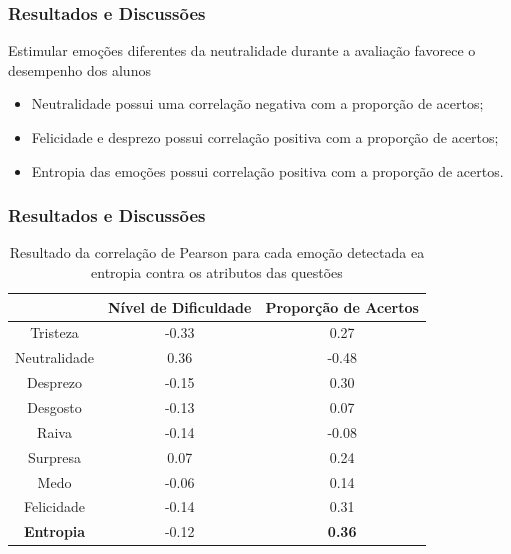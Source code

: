 \documentclass{beamer}
\begin{document}
\begin{frame}
\frametitle{Resultados e Discuss\~oes}
\begin{block}{Estimular emo\c{c}\~oes diferentes da neutralidade durante a avalia\c{c}\~ao favorece o desempenho dos alunos}
\begin{itemize}
\item Neutralidade possui uma correla\c{c}\~ao negativa com a propor\c{c}\~ao de acertos;
\item Felicidade e desprezo possui correla\c{c}\~ao positiva com a propor\c{c}\~ao de acertos;
\pause
\item Entropia das emo\c{c}\~oes possui correla\c{c}\~ao positiva com a propor\c{c}\~ao de acertos.
\end{itemize}
\end{block}

\end{frame}

\begin{frame}
\frametitle{Resultados e Discuss\~oes}
\begin{table}[]\footnotesize
\centering
\caption{Resultado​ ​da​ ​correla\c{c}\~ao​ ​de​ ​Pearson​ ​para​ ​cada​ ​emo\c{c}\~ao​ ​detectada
e​ ​a​ ​entropia​ ​contra​ ​os​ ​atributos​ ​das​ ​quest\~oes}
\label{my-label}
\begin{tabular}{|c|c|c|}
\hline
                      & \textbf{Nível de Dificuldade} & \textbf{Proporção de Acertos} \\ \hline
Tristeza	     & -0.33                & 0.27                          \\ \hline
Neutralidade & 0.36                 & -0.48                \\ \hline
Desprezo     		& -0.15                         & 0.30                 \\ \hline
Desgosto              & -0.13                         & 0.07                          \\ \hline
Raiva                 & -0.14                         & -0.08                         \\ \hline
Surpresa              & 0.07                          & 0.24                          \\ \hline
Medo                  & -0.06                         & 0.14                          \\ \hline
Felicidade   		& -0.14                         & 0.31                 \\ \hline
\small \textbf{Entropia}     		& -0.12                         & \small \textbf{0.36}                 \\ \hline
\end{tabular}
\end{table}
\end{frame}
\end{document}
